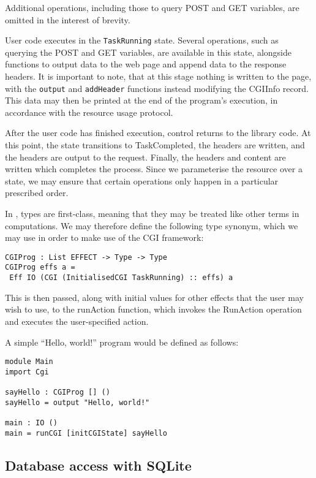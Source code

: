 \documentclass[preprint]{sigplanconf}
\begin{document}
Additional operations, including those to query POST and GET variables, are omitted in the interest of brevity.

User code executes in the \texttt{TaskRunning} state. Several operations, such as querying the POST and GET variables, are available in this state, alongside functions to output data to the web page and append data to the response headers. It is important to note, that at this stage nothing is written to the page, with the \texttt{output} and \texttt{addHeader} functions instead modifying the CGIInfo record. This data may then be printed at the end of the program's execution, in accordance with the resource usage protocol.

After the user code has finished execution, control returns to the library code. At this point, the state transitions to TaskCompleted, the headers are written, and the headers are output to the request. Finally, the headers and content are written which completes the process. Since we parameterise the resource over a state, we may ensure that certain operations only happen in a particular prescribed order.

In \idris{}, types are first-class, meaning that they may be treated like other terms in computations. We may therefore define the following type synonym, which we may use in order to make use of the CGI framework: 
\begin{Verbatim}
CGIProg : List EFFECT -> Type -> Type
CGIProg effs a = 
 Eff IO (CGI (InitialisedCGI TaskRunning) :: effs) a
\end{Verbatim}
This is then passed, along with initial values for other effects that the user may wish to use, to the runAction function, which invokes the RunAction operation and executes the user-specified action.

A simple ``Hello, world!'' program would be defined as follows:

\begin{Verbatim}
module Main
import Cgi

sayHello : CGIProg [] ()
sayHello = output "Hello, world!"

main : IO ()
main = runCGI [initCGIState] sayHello
\end{Verbatim}

\subsection{Database access with SQLite}
\end{document}
